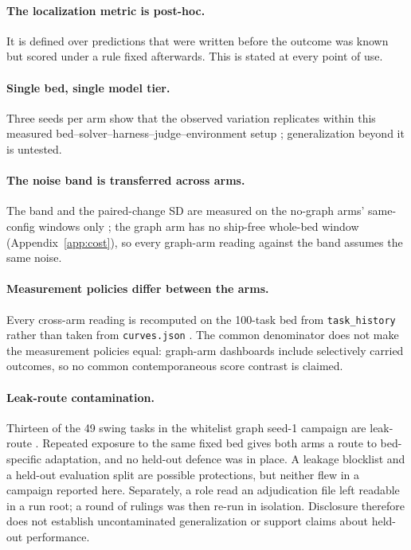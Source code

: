 \paragraph{The localization metric is post-hoc.} It is defined over
predictions that were written before the outcome was known but scored
under a rule fixed afterwards. This is stated at every point of use.

\paragraph{Single bed, single model tier.} Three seeds per arm show that
the observed variation replicates within this measured
bed--solver--harness--judge--environment setup ; generalization
beyond it is untested.

\paragraph{The noise band is transferred across arms.} The band and the
paired-change SD are measured on the no-graph arms' same-config windows only
; the graph arm has no ship-free whole-bed window
(Appendix~\ref{app:cost}), so every graph-arm reading against the band
assumes the same noise.

\paragraph{Measurement policies differ between the arms.} Every cross-arm
reading is recomputed on the 100-task bed from \texttt{task\_history}
rather than taken from \texttt{curves.json} . The common
denominator does not make the measurement policies equal: graph-arm
dashboards include selectively carried outcomes, so no common
contemporaneous score contrast is claimed.

\paragraph{Leak-route contamination.} Thirteen of the 49 swing tasks in
the whitelist graph seed-1 campaign are leak-route . Repeated exposure to the same fixed bed gives both arms
a route to bed-specific adaptation, and no held-out defence was in place.
A leakage blocklist and a held-out evaluation split are possible
protections, but neither flew in a campaign reported here. Separately, a role
read an adjudication file left readable in a run root; a round of rulings was
then re-run in isolation. Disclosure therefore does not establish uncontaminated
generalization or support claims about held-out performance.

